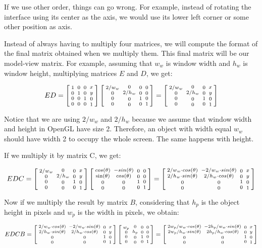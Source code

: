 If we use other order, things can go wrong. For example, instead of
rotating the interface using its center as the axis, we would use
its lower left corner or some other position as axis.

Instead of always having to multiply four matrices, we will compute
the format of the final matrix obtained when we multiply them. This
final matrix will be our model-view matrix. For example, assuming that
$w_w$ is window width and $h_w$ is window height, multiplying matrices
$E$ and $D$, we get:


$$ ED=\left[{{1 \atop 0}\atop {0\atop 0}}{{0 \atop 1}\atop {0 \atop
      0}}{{0\atop 0}\atop{1 \atop 0}}{{x \atop y}\atop{0\atop
      1}}\right]\left[{{2/w_w \atop 0}\atop {0\atop 0}}{{0 \atop
      2/h_w}\atop {0 \atop 0}}{{0\atop 0}\atop{1 \atop 0}}{{0 \atop
      0}\atop{0\atop 1}}\right]=
\left[{{2/w_w \atop 0}\atop {0\atop 0}}
  {{0 \atop 2/h_w}\atop {0 \atop 0}}
  {{0\atop 0}\atop{1 \atop 0}}
  {{x \atop y}\atop{0\atop 1}}\right]
$$

Notice that we are using $2/w_w$ and $2/h_w$ because we assume that
window width and height in OpenGL have size 2. Therefore, an object
with width equal $w_w$ should have width 2 to occupy the whole
screen. The same happens with height.

If we multiply it by matrix C, we get:

$$
EDC = \left[{{2/w_w \atop 0}\atop {0\atop 0}} {{0 \atop 2/h_w}\atop
  {0 \atop 0}} {{0\atop 0}\atop{1 \atop 0}} {{x \atop y}\atop{0\atop
  1}}\right]\left[{{cos(\theta) \atop \sin(\theta)}\atop {0\atop
  0}}{{-sin(\theta) \atop cos(\theta)}\atop {0 \atop 0}}{{0\atop
  0}\atop{1 \atop 0}}{{0 \atop 0}\atop{0\atop 1}}\right] =
\left[{{2/w_w\cdot cos(\theta) \atop 2/h_w\cdot sin(\theta)}
\atop {0\atop 0}}
  {{-2/w_w\cdot sin(\theta) \atop 2/h_w\cdot cos(\theta)}\atop
  {0 \atop 0}} {{0\atop 0}\atop{1 \atop 0}} {{x \atop y}\atop{0\atop
  1}}\right]
$$


Now if we multiply the result by matrix $B$, considering that $h_p$ is
the object height in pixels and $w_p$ is the width in pixels, we
obtain:

$$ EDCB =
\left[{{2/w_w\cdot cos(\theta) \atop 2/h_w\cdot sin(\theta)}
\atop {0\atop 0}}
  {{-2/w_w\cdot sin(\theta) \atop 2/h_w\cdot cos(\theta)}\atop
  {0 \atop 0}} {{0\atop 0}\atop{1 \atop 0}} {{x \atop y}\atop{0\atop
  1}}\right]\left[{{w_p \atop 0}\atop {0\atop 0}}{{0 \atop h_p}\atop
  {0 \atop 0}}{{0\atop 0}\atop{1 \atop 0}}{{0 \atop 0}\atop{0\atop
  1}}\right]=
\left[{{2w_p/w_w\cdot cos(\theta) \atop 2w_p/h_w\cdot sin(\theta)}
\atop {0\atop 0}}
  {{-2h_p/w_w\cdot sin(\theta) \atop 2h_p/h_w\cdot cos(\theta)}\atop
  {0 \atop 0}} {{0\atop 0}\atop{1 \atop 0}} {{x \atop y}\atop{0\atop
  1}}\right]
$$

